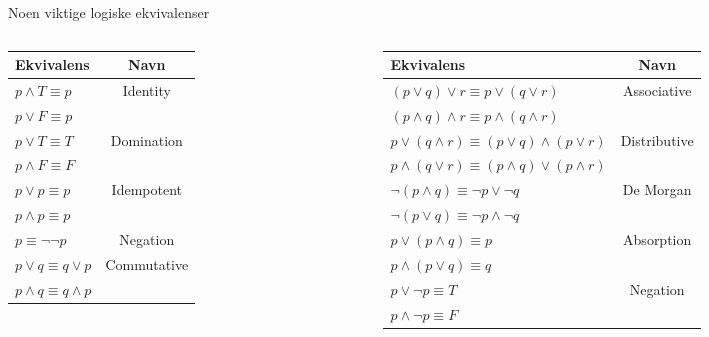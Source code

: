 \begin{frame}{Noen viktige logiske ekvivalenser}
    \begin{columns}
    \begin{column}{0.33\textwidth}
        \begin{tabular}{l|c}
        Ekvivalens & Navn \\ \hline
        $p \land T \equiv p$ & Identity\\
        $p \lor F \equiv p$ \\ \hline
        
        $p \lor T \equiv T$ & Domination\\
        $p \land F \equiv F$\\ \hline
        
        $p \lor p \equiv p$ & Idempotent\\
        $p \land p \equiv p$ \\ \hline
        
        $p \equiv \lnot \lnot p$ & Negation\\ \hline
        
        $p \lor q \equiv q \lor p$ & Commutative\\
        $p \land q \equiv q \land p$ \\
        

    \end{tabular}
    \end{column}
    \begin{column}{0.48\textwidth}
        \begin{tabular}{l|c}
        Ekvivalens & Navn \\ \hline
        
        $(p \lor q) \lor r \equiv p \lor (q \lor r)$ & Associative\\
        $(p \land q) \land r \equiv p \land (q \land r)$ \\ \hline
        
        $p \lor (q \land r) \equiv (p \lor q) \land (p \lor r)$ & Distributive\\
        $p \land (q \lor r) \equiv (p \land q) \lor (p \land r)$ \\ \hline
        
        $\lnot (p \land q) \equiv \lnot p \lor \lnot q$ & De Morgan \\
        $\lnot (p \lor q) \equiv \lnot p \land \lnot q$ \\ \hline
        
        $p \lor (p \land q) \equiv p$ & Absorption \\
        $p \land (p \lor q) \equiv q$ \\ \hline
        
        $p \lor \lnot p \equiv T$ & Negation \\
        $p \land \lnot p \equiv F$ \\
        \end{tabular}
    \end{column}
\end{columns}
\end{frame}

